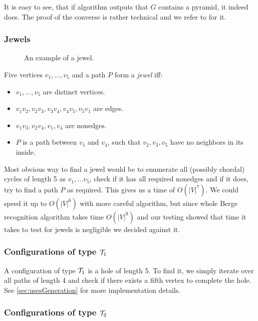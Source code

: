 It is easy to see, that if algorithm outputs that $G$ contains a pyramid, it indeed does. The proof of the converse is rather technical and we refer to \cite{MC05} for it.

\subsubsection{Jewels}

\begin{wrapfigure}{r}{0.35\textwidth}
	
	\caption{An example of a jewel.}
	\vspace{-1.5cm}
\end{wrapfigure}


Five vertices $v_1, \ldots, v_5$ and a path $P$ form a \emph{jewel} iff:

\begin{itemize}
	\item $v_1, \ldots, v_5$ are distinct vertices.
	\item $v_1v_2, v_2v_3, v_3v_4, v_4v_5, v_5v_1$ are edges.
	\item $v_1v_3, v_2v_4, v_1,v_4$ are nonedges.
	\item $P$ is a path between $v_1$ and $v_4$, such that $v_2, v_3, v_5$ have no neighbors in its inside.
\end{itemize}

Most obvious way to find a jewel would be to enumerate all (possibly chordal) cycles of length 5 as $v_1, \ldots v_5$, check if it has all required nonedges and if it does, try to find a path $P$ as required. This gives us a time of $O(|V|^7)$. We could speed it up to $O(|V|^6)$ with more careful algorithm, but since whole Berge recognition algorithm takes time $O(|V|^9)$ and our testing showed that time it takes to test for jewels is negligible we decided against it.

\subsubsection{Configurations of type $\mathcal{T}_1$}

A configuration of type $\mathcal{T}_1$ is a hole of length 5. To find it, we simply iterate over all paths of length 4 and check if there exists a fifth vertex to complete the hole. See \cref{sec:usesGeneration} for more implementation details.

\subsubsection{Configurations of type $\mathcal{T}_2$}

